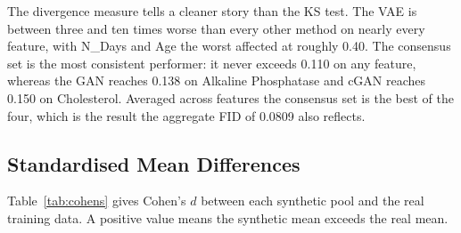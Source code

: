 \documentclass[journal,onecolumn]{IEEEtran}
\begin{document}
\begin{table}[!t]
  \centering
  \caption{Jensen-Shannon Divergence Between Synthetic and Real Training Distributions. Lower is Better}
  \label{tab:jsd}
\end{table}

The divergence measure tells a cleaner story than the KS test. The VAE is between three and ten times worse than every other method on nearly every feature, with N\_Days and Age the worst affected at roughly 0.40. The consensus set is the most consistent performer: it never exceeds 0.110 on any feature, whereas the GAN reaches 0.138 on Alkaline Phosphatase and cGAN reaches 0.150 on Cholesterol. Averaged across features the consensus set is the best of the four, which is the result the aggregate FID of 0.0809 also reflects.

\subsection{Standardised Mean Differences}

Table~\ref{tab:cohens} gives Cohen's $d$ between each synthetic pool and the real training data. A positive value means the synthetic mean exceeds the real mean.
\end{document}

